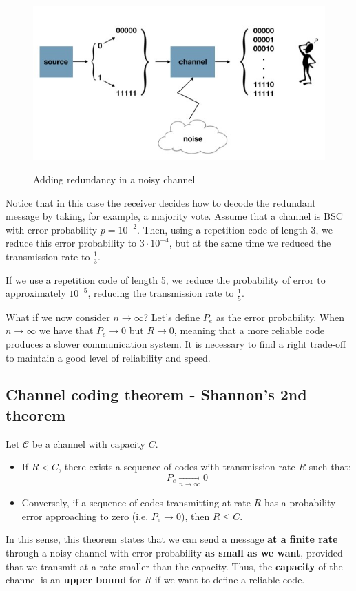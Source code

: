 \begin{figure}[h!]
		\centering
        \includegraphics[scale = 1.5]{img/redundancy.jpg}
		\label{mi}
        \caption{Adding redundancy in a noisy channel}
\end{figure}

Notice that in this case the receiver decides how to decode the redundant message by taking, for example, a majority vote. Assume that a channel is BSC with error probability $p = 10^{-2}$. Then, using a repetition code of length 3, we reduce this error probability to $3 \cdot 10^{-4}$, but at the same time we reduced the transmission rate to $\frac{1}{3}$.

If we use a repetition code of length 5, we reduce the probability of error to approximately $10^{-5}$, reducing the transmission rate to $\frac{1}{5}$.

What if we now consider $n \rightarrow \infty$? Let's define $P_e$ as the error probability. When $n \rightarrow \infty$ we have that $P_e \rightarrow 0$ but $R \rightarrow 0$, meaning that a more reliable code produces a slower communication system.
It is necessary to find a right trade-off to maintain a good level of reliability and speed.

\subsection{Channel coding theorem - Shannon's 2nd theorem}
\begin{thm}
	Let $\mathcal{C}$ be a channel with capacity $C$.
	\begin{itemize}
		\item If $R < C$, there exists a sequence of codes with transmission rate $R$ such that:
		$$P_e  \underset{n \rightarrow \infty}{\rightarrow} 0$$

        \item Conversely, if a sequence of codes transmitting at rate $R$ has a probability error approaching to zero (i.e. $P_{e} \rightarrow 0$), then $R \leq C$. 
        \end{itemize}
\end{thm}

In this sense, this theorem states that we can send a message \textbf{at a finite rate} through a noisy channel with error probability \textbf{as small as we want}, provided that we transmit at a rate smaller than the capacity. Thus, the \textbf{capacity} of the channel is an \textbf{upper bound} for $R$ if we want to define a reliable code.
